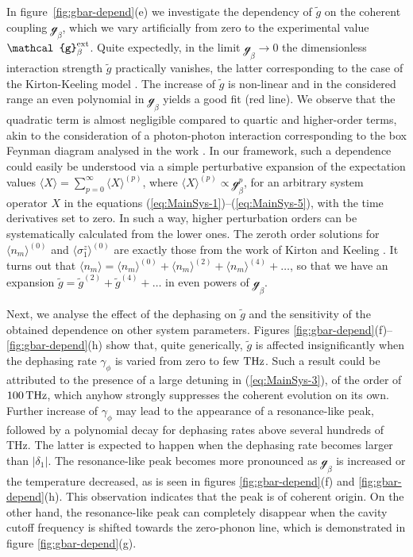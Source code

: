 \documentclass[12pt, a4paper]{iopart}
\newcommand{\avg}[1]{\langle{#1}\rangle}
\begin{document}
{In figure~\ref{fig:gbar-depend}(e) we investigate the dependency of $\tilde{g}$ on the coherent coupling $\mathcal{g}_\beta$, which we vary artificially from zero to the experimental value $\mathcal{g}_\beta^{\rm ext}$.  Quite expectedly, in the limit $\mathcal{g}_\beta\to 0$ the dimensionless interaction strength $\tilde{g}$ practically vanishes, the latter corresponding to the case of the Kirton-Keeling model \cite{Keeling_PRL-nonequilibrium_model_photon-cond,Keeling-Thermalization_photon_condensate}. The increase of $\tilde{g}$ is non-linear and in the considered range an even polynomial in $\mathcal{g}_\beta$ yields a good fit (red line). We observe that the quadratic term is almost negligible compared to quartic and higher-order terms, akin to the consideration of a photon-photon interaction corresponding to the box Feynman diagram analysed in the work \cite{StoofPRL-Interaction}. In our framework, such a dependence could easily be understood via a simple perturbative expansion of the expectation values $\avg{X}=\sum_{p=0}^\infty\avg{X}^{(p)}$,
where $\avg{X}^{(p)}\propto\mathcal{g}_\beta^p$, for an arbitrary system operator $X$ in the equations (\ref{eq:MainSys-1})--(\ref{eq:MainSys-5}), with the time derivatives set to zero. In such a way, higher perturbation orders can be systematically calculated from the lower ones. The zeroth order solutions for $\avg{n_m^{}}^{(0)}$ and $\avg{\sigma^z_1}^{(0)}$ are exactly those from the work of Kirton and Keeling \cite{Keeling_PRL-nonequilibrium_model_photon-cond,Keeling-Thermalization_photon_condensate}. It turns out that $\avg{n_m^{}}=\avg{n_m^{}}^{(0)}+\avg{n_m^{}}^{(2)}+\avg{n_m^{}}^{(4)}+\ldots$, so that we have an expansion $\tilde{g}=\tilde{g}^{(2)}+\tilde{g}^{(4)}+\ldots$ in even powers of $\mathcal{g}_\beta$.}

{Next, we analyse the effect of the dephasing on $\tilde{g}$ and the sensitivity of the obtained dependence on other system parameters. Figures \ref{fig:gbar-depend}(f)--\ref{fig:gbar-depend}(h) show that, quite generically, $\tilde{g}$ is affected insignificantly when the dephasing rate $\gamma_\phi$ is varied from zero to few ${\rm THz}$. Such a result could be attributed to the presence of a large detuning in (\ref{eq:MainSys-3}), of the order of $100\,{\rm THz}$, which anyhow strongly suppresses the coherent evolution on its own. Further increase of $\gamma_\phi$ may lead to the appearance of a resonance-like peak, followed by a polynomial decay for dephasing rates above several hundreds of THz. The latter is expected to happen when the dephasing rate becomes larger than $|\delta_1|$. The resonance-like peak becomes more pronounced as $\mathcal{g}_\beta$ is increased or the temperature decreased, as is seen in figures \ref{fig:gbar-depend}(f) and \ref{fig:gbar-depend}(h). This observation indicates that the peak is of coherent origin. On the other hand, the resonance-like peak can completely disappear when the cavity cutoff frequency is shifted towards the zero-phonon line, which is demonstrated in figure \ref{fig:gbar-depend}(g).}
\end{document}
